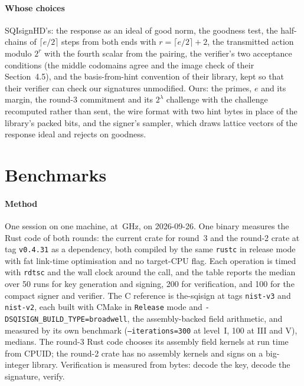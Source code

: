 \documentclass[11pt]{article}
\begin{document}
\paragraph{Whose choices}
SQIsignHD's: the response as an ideal of good norm, the goodness test, the
half-chains of $\lceil e/2 \rceil$ steps from both ends with $r = \lceil
e/2 \rceil + 2$, the transmitted action modulo $2^r$ with the fourth scalar
from the pairing, the verifier's two acceptance conditions (the middle
codomains agree and the image check of their Section~4.5), and the
basis-from-hint convention of their library, kept so that their verifier
can check our signatures unmodified.  Ours: the primes, $e$ and its
margin, the round-3 commitment and its $2^\lambda$ challenge with the
challenge recomputed rather than sent, the wire format with two hint bytes
in place of the library's packed bits, and the signer's sampler, which
draws lattice vectors of the response ideal and rejects on goodness.

\begin{table}[H]
\centering
\begin{threeparttable}
\caption{Dimension-4 parameters at the round-3 primes.  Level~I is built
and measured; levels III and V are derived only.}
\label{tab:parameters}
\small

\end{threeparttable}
\end{table}

\section{Benchmarks}
\label{sec:bench}

\paragraph{Method}
One session on one machine, \MachineXeon{} at \XeonGHz{}\,GHz, on
2026-09-26.  One binary measures the Rust code of both rounds: the current
crate for round~3 and the round-2 crate at tag \texttt{v0.4.31} as a
dependency, both compiled by the same \texttt{rustc} in release mode with
fat link-time optimisation and no target-CPU flag.  Each operation is
timed with \texttt{rdtsc} and the wall clock around the call, and the
table reports the median over 50 runs for key generation and signing, 200
for verification, and 100 for the compact signer and verifier.  The C
reference is the-sqisign at tags \texttt{nist-v3} and \texttt{nist-v2},
each built with CMake in \texttt{Release} mode and
\texttt{-DSQISIGN\_BUILD\_TYPE=broadwell}, the assembly-backed field
arithmetic, and measured by its own benchmark
(\texttt{--iterations=300} at level~I, 100 at III and V), medians.  The
round-3 Rust code chooses its assembly field kernels at run time from
CPUID; the round-2 crate has no assembly kernels and signs on a
big-integer library.  Verification is measured from bytes: decode the
key, decode the signature, verify.
\end{document}
